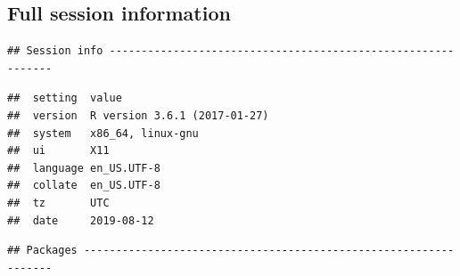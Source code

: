 \documentclass[11pt,a4paper,titlepage,twoside,openright]{style/unimelbthesis}
\theoremstyle{definition}
\theoremstyle{definition}
\theoremstyle{definition}
\theoremstyle{remark}
\begin{document}
\begin{mainmatter}
\hypertarget{full-session-information}{%
\section{Full session information}\label{full-session-information}}

\begin{verbatim}
## Session info -------------------------------------------------------------
\end{verbatim}

\begin{verbatim}
##  setting  value                       
##  version  R version 3.6.1 (2017-01-27)
##  system   x86_64, linux-gnu           
##  ui       X11                         
##  language en_US.UTF-8                 
##  collate  en_US.UTF-8                 
##  tz       UTC                         
##  date     2019-08-12
\end{verbatim}

\begin{verbatim}
## Packages -----------------------------------------------------------------
\end{verbatim}


\end{mainmatter}
\end{document}
